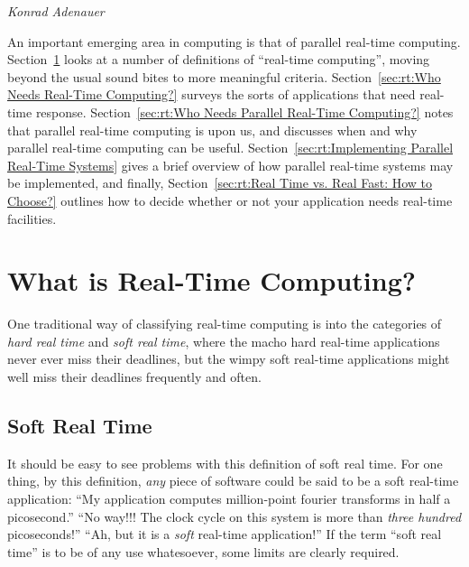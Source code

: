 
%
	 {\emph{Konrad Adenauer}}

An important emerging area in computing is that of parallel real-time
computing.
Section~\ref{sec:rt:What is Real-Time Computing?}
looks at a number of definitions of ``real-time computing'', moving
beyond the usual sound bites to more meaningful criteria.
Section~\ref{sec:rt:Who Needs Real-Time Computing?}
surveys the sorts of applications that need real-time response.
Section~\ref{sec:rt:Who Needs Parallel Real-Time Computing?}
notes that parallel real-time computing is upon us, and discusses
when and why parallel real-time computing can be useful.
Section~\ref{sec:rt:Implementing Parallel Real-Time Systems}
gives a brief overview of how parallel real-time systems may be implemented,
and finally,
Section~\ref{sec:rt:Real Time vs. Real Fast: How to Choose?}
outlines how to decide whether or not your application needs real-time
facilities.

\section{What is Real-Time Computing?}
\label{sec:rt:What is Real-Time Computing?}

One traditional way of classifying real-time computing is into the categories
of \emph{hard real time} and \emph{soft real time}, where the macho
hard real-time applications never ever miss their deadlines, but the
wimpy soft real-time applications might well miss their deadlines
frequently and often.

\subsection{Soft Real Time}
\label{sec:Soft Real Time}

It should be easy to see problems with this definition of soft real time.
For one thing, by this definition, \emph{any} piece of software could be
said to be a soft real-time application:
``My application computes million-point fourier transforms in half a
picosecond.''
``No way!!!
The clock cycle on this system is more than \emph{three hundred} picoseconds!''
``Ah, but it is a \emph{soft} real-time application!''
If the term ``soft real time'' is to be of any use whatesoever, some limits
are clearly required.

